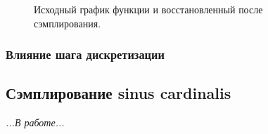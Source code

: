 \documentclass[a5paper, 10pt]{article}
\theoremstyle{definition}
\theoremstyle{plain}
\theoremstyle{remark}
\begin{document}
\begin{figure}[h!]
\caption{Исходный график функции и восстановленный после сэмплирования.}
\end{figure}

\subsubsection{Влияние шага дискретизации}


\subsection{Сэмплирование sinus cardinalis}
\textit{...В работе...}
\end{document}
